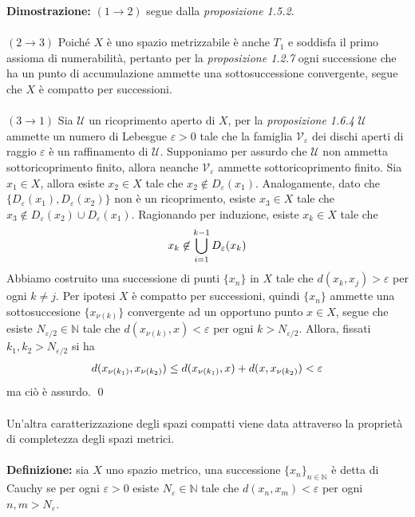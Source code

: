\documentclass{article}
\begin{document}
\textbf{Dimostrazione:} $(1 \rightarrow 2)$ segue dalla \textit{proposizione 1.5.2}. \\ \\
$(2 \rightarrow 3)$ Poiché $X$ è uno spazio metrizzabile è anche $T_1$ e soddisfa il primo assioma di numerabilità, pertanto per la \textit{proposizione 1.2.7} ogni successione che ha un punto di accumulazione ammette una sottosuccessione convergente, segue che $X$ è compatto per successioni. \\ \\
$(3 \rightarrow 1)$ Sia $\mathcal{U}$ un ricoprimento aperto di $X$, per la \textit{proposizione 1.6.4} $\mathcal{U}$ ammette un numero di Lebesgue $\varepsilon > 0$ tale che la famiglia $\mathcal{V}_\varepsilon$ dei dischi aperti di raggio $\varepsilon$ è un raffinamento di $\mathcal{U}$. Supponiamo per assurdo che $\mathcal{U}$ non ammetta sottoricoprimento finito, allora neanche $\mathcal{V}_\varepsilon$ ammette sottoricoprimento finito. Sia $x_1 \in X$, allora esiste $x_2 \in X$ tale che $x_2 \not\in D_\varepsilon(x_1)$. Analogamente, dato che $\{D_\varepsilon(x_1), D_\varepsilon(x_2)\}$ non è un ricoprimento, esiste $x_3 \in X$ tale che $x_3 \not\in D_\varepsilon(x_2) \cup D_\varepsilon(x_1)$. Ragionando per induzione, esiste $x_k \in X$ tale che
\begin{align}
    x_k \not\in \bigcup_{i = 1}^{k - 1}D_\varepsilon(x_k) \notag
\end{align}
Abbiamo costruito una successione di punti $\{x_n\}$ in $X$ tale che $d(x_k, x_j) > \varepsilon$ per ogni $k \neq j$. Per ipotesi $X$ è compatto per successioni, quindi $\{x_n\}$ ammette una sottosuccesione $\{x_{\nu(k)}\}$ convergente ad un opportuno punto $x \in X$, segue che esiste $N_{\varepsilon/2} \in \mathbb{N}$ tale che $d(x_{\nu(k)}, x) < \varepsilon$ per ogni $k > N_{\varepsilon/2}$. Allora, fissati $k_1, k_2 > N_{\varepsilon/2}$ si ha 
\begin{align}
    d(x_{\nu(k_1)}, x_{\nu(k_2)}) \leq d(x_{\nu(k_1)}, x) + d(x, x_{\nu(k_2)}) < \varepsilon \notag
\end{align}
ma ciò è assurdo. \qed \\ \\
Un'altra caratterizzazione degli spazi compatti viene data attraverso la proprietà di completezza degli spazi metrici. \\ \\
\textbf{Definizione:} sia $X$ uno spazio metrico, una successione $\{x_n\}_{n \in \mathbb{N}}$ è detta di Cauchy se per ogni $\varepsilon > 0$ esiste $N_\varepsilon \in \mathbb{N}$ tale che $d(x_n, x_m) < \varepsilon$ per ogni $n, m > N_\varepsilon$. \\ \\
\end{document}

